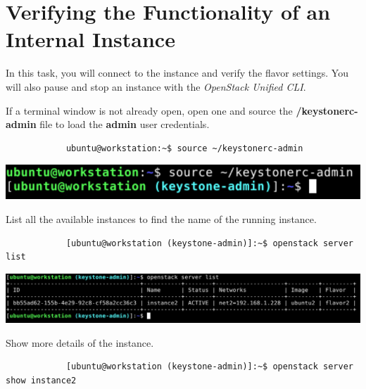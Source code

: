 \documentclass[letterpaper, 12pt]{article}
\begin{document}
\section{Verifying the Functionality of an Internal Instance}\label{sec:verifying_the_functionality_of_an_internal_instance}
In this task, you will connect to the instance and verify the flavor settings.
You will also pause and stop an instance with the \textit{OpenStack Unified CLI}.

\begin{enumerate}
    \begin{labstep}
        If a terminal window is not already open, open one and source the \textbf{\texttildemid/keystonerc-admin} file to load the \textbf{admin} user credentials.
        \begin{lstlisting}
            ubuntu@workstation:~$ source ~/keystonerc-admin
        \end{lstlisting}

        \begin{center}
            \includegraphics[width=\linewidth]{images/part5/step1.png}
        \end{center}
    \end{labstep}

    \begin{labstep}
        List all the available instances to find the name of the running instance.
        \begin{lstlisting}
            [ubuntu@workstation (keystone-admin)]:~$ openstack server list
        \end{lstlisting}

        \begin{center}
            \includegraphics[width=\linewidth]{images/part5/step2.png}
        \end{center}
    \end{labstep}

    \begin{labstep}
        Show more details of the instance.
        \begin{lstlisting}
            [ubuntu@workstation (keystone-admin)]:~$ openstack server show instance2
        \end{lstlisting}


\end{labstep}
\end{enumerate}
\end{document}
